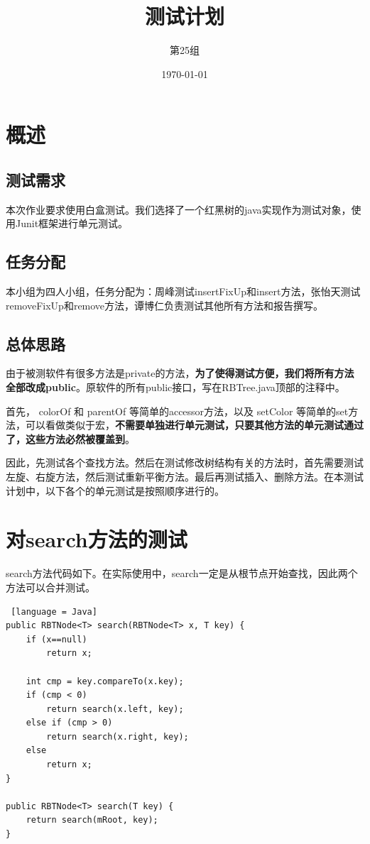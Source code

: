 \documentclass[12pt, a4paper, oneside]{ctexart}
\title{\textbf{测试计划}}
\author{第25组}
\date{\today}
\begin{document}
\maketitle
\section{概述}
\subsection{测试需求}
本次作业要求使用白盒测试。我们选择了一个红黑树的java实现作为测试对象，使用Junit框架进行单元测试。

\subsection{任务分配}
本小组为四人小组，任务分配为：周峰测试insertFixUp和insert方法，张怡天测试removeFixUp和remove方法，谭博仁负责测试其他所有方法和报告撰写。

\subsection{总体思路}
由于被测软件有很多方法是private的方法，\textbf{为了使得测试方便，我们将所有方法全部改成public}。原软件的所有public接口，写在RBTree.java顶部的注释中。

首先， colorOf 和 parentOf 等简单的accessor方法，以及 setColor 等简单的set方法，可以看做类似于宏，\textbf{不需要单独进行单元测试，只要其他方法的单元测试通过了，这些方法必然被覆盖到}。

因此，先测试各个查找方法。然后在测试修改树结构有关的方法时，首先需要测试左旋、右旋方法，然后测试重新平衡方法。最后再测试插入、删除方法。在本测试计划中，以下各个的单元测试是按照顺序进行的。


\section{对search方法的测试}

search方法代码如下。在实际使用中，search一定是从根节点开始查找，因此两个方法可以合并测试。

\begin{lstlisting} [language = Java]
public RBTNode<T> search(RBTNode<T> x, T key) {
    if (x==null)
        return x;

    int cmp = key.compareTo(x.key);
    if (cmp < 0)
        return search(x.left, key);
    else if (cmp > 0)
        return search(x.right, key);
    else
        return x;
}

public RBTNode<T> search(T key) {
    return search(mRoot, key);
}
\end{lstlisting}
\end{document}
